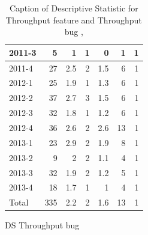 \documentclass[UKenglish]{ifimaster}  %
\begin{document}
\begin{appendices}
\begin{table}[!htbp]
\begin{adjustwidth}{-2.5cm}{}
\begin{subfigure}[b]{0.3\textwidth}
{\begin{tabular}{ | l | r | r | r | r | r | r | }
 2011-3  & 5 & 1 & 1 & 0 &1 & 1 \\ \hline
 2011-4  & 27 & 2.5 & 2 & 1.5 & 6 & 1 \\ \hline
 2012-1  & 25 & 1.9 & 1 & 1.3 & 6 & 1 \\ \hline
 2012-2  & 37 & 2.7 & 3 & 1.5 & 6 & 1 \\ \hline
 2012-3  & 32 & 1.8 & 1 & 1.2 & 6 & 1 \\ \hline
 2012-4  & 36 & 2.6 & 2 & 2.6 & 13 & 1 \\ \hline
 2013-1  & 23 & 2.9 & 2 & 1.9 & 8 & 1 \\ \hline
 2013-2  & 9 & 2 & 2 & 1.1 & 4 & 1 \\ \hline
 2013-3  & 32 & 1.9 & 2 & 1.2 & 5 & 1 \\ \hline
 2013-4  & 18 & 1.7 & 1 & 1 & 4 & 1 \\ \hline
 Total  & 335 & 2.2 & 2 & 1.6 & 13 & 1 \\ \hline
\end{tabular}
}
\caption{DS Throughput bug}
 \label{DS:TPB:10}
\end{subfigure}
\end{adjustwidth}
\caption[Optional caption for list of figures]{Caption of Descriptive Statistic for Throughput feature and Throughput bug  , }
\label{DS:10:2}
\end{table}




\end{appendices}
\end{document}
